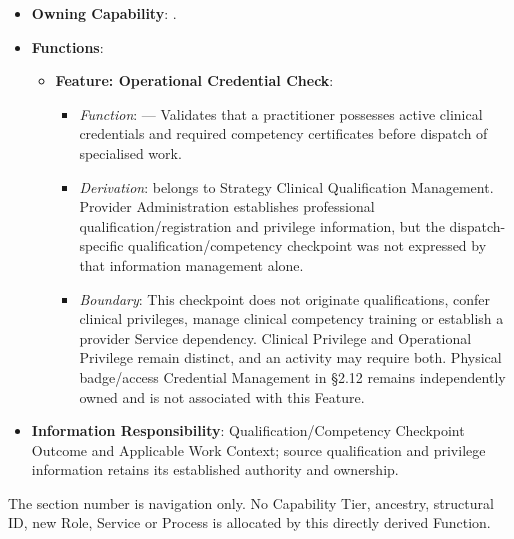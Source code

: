\begin{itemize}

\item
\textbf{Owning Capability}: \texttt{}.



\item
\textbf{Functions}:


\begin{itemize}

\item
\textbf{Feature: Operational Credential Check}:


\begin{itemize}

\item
\emph{Function}: \texttt{} — Validates that a practitioner possesses active clinical credentials and required competency certificates before dispatch of specialised work.



\item
\emph{Derivation}: \texttt{} belongs to Strategy Clinical Qualification Management. Provider Administration establishes professional qualification/\allowbreak{}registration and privilege information, but the dispatch-specific qualification/\allowbreak{}competency checkpoint was not expressed by that information management alone.



\item
\emph{Boundary}: This checkpoint does not originate qualifications, confer clinical privileges, manage clinical competency training or establish a provider Service dependency. Clinical Privilege and Operational Privilege remain distinct, and an activity may require both. Physical badge/\allowbreak{}access Credential Management in §2.12 remains independently owned and is not associated with this Feature.



\end{itemize}


\end{itemize}


\item
\textbf{Information Responsibility}: Qualification/\allowbreak{}Competency Checkpoint Outcome and Applicable Work Context; source qualification and privilege information retains its established authority and ownership.



\end{itemize}
\label{rad:hso:300}

The section number is navigation only. No Capability Tier, ancestry, structural ID, new Role, Service or Process is allocated by this directly derived Function.
